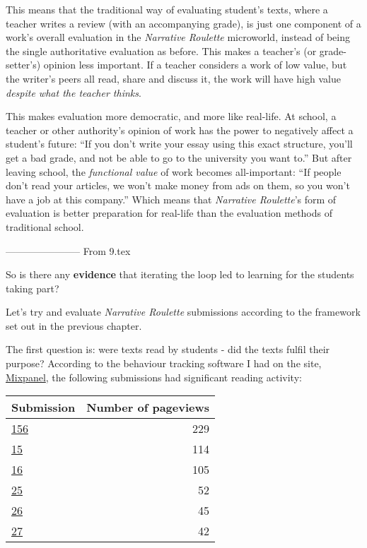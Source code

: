 This means that the traditional way of evaluating student's texts, where a
teacher writes a review (with an accompanying
grade), is just one component of a work's overall evaluation in the 
\emph{Narrative Roulette} microworld, instead of being the single authoritative evaluation as before. This makes a teacher's (or grade-setter's)
opinion less important. If a teacher considers a work of low value, but
the writer's peers all read, share and discuss it, the work will have high value
\emph{despite what the teacher thinks}.

This makes evaluation more democratic, and more like real-life. At school, a teacher or other authority's opinion of work has the power to
negatively affect a student's future: ``If you don't write your essay
using this exact structure, you'll get a bad grade, and not be able to
go to the university you want to.'' But after leaving school, the \emph{functional value} of work becomes all-important: ``If people don't read
your articles, we won't make money from ads on them, so you won't have a job at this company.'' Which
means that \emph{Narrative Roulette}'s form of evaluation is better
preparation for real-life than the evaluation methods of traditional school.

----------------------- From 9.tex

So is there any \textbf{evidence} that iterating the loop led to learning for the students taking part? 

Let's try and evaluate \emph{Narrative Roulette} submissions according to the framework set out in the previous chapter. 

The first question is: were texts read by students - did the texts fulfil their purpose? According to the behaviour tracking software I had on the site, \href{http://mixpanel.com}{Mixpanel}, the following submissions had significant reading activity:

\begin{center}
  \begin{tabular}{ | l | r | }
    \hline
    \textbf{Submission} & \textbf{Number of pageviews}\\ \hline
    \href{http://kg.narrativeroulette.com/submission/156}{156} & 229 \\
    \href{http://kg.narrativeroulette.com/submission/15}{15} & 114 \\
    \href{http://kg.narrativeroulette.com/submission/16}{16} & 105 \\
    \href{http://kg.narrativeroulette.com/submission/25}{25} & 52 \\
    \href{http://kg.narrativeroulette.com/submission/26}{26} & 45 \\
    \href{http://kg.narrativeroulette.com/submission/27}{27}  & 42 \\
    \hline
  \end{tabular}
\end{center}

